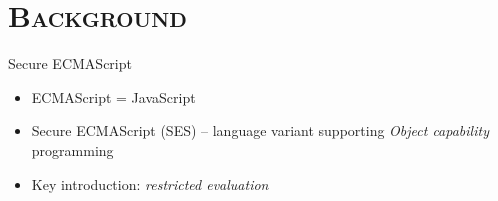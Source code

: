 \documentclass[xcolor=x11names,compress]{beamer}
\renewcommand{\(}{\begin{columns}}
\renewcommand{\)}{\end{columns}}
\newcommand{\<}[1]{\begin{column}{#1}}
\renewcommand{\>}{\end{column}}
\begin{document}

\section{\scshape Background}
\begin{frame}{Secure ECMAScript}
  \begin{itemize}
    \item ECMAScript = JavaScript
    \item Secure ECMAScript (SES) -- language variant supporting \emph{Object
      capability} programming
    \item Key introduction: \emph{restricted evaluation}
  \end{itemize}
\end{frame}
\end{document}
